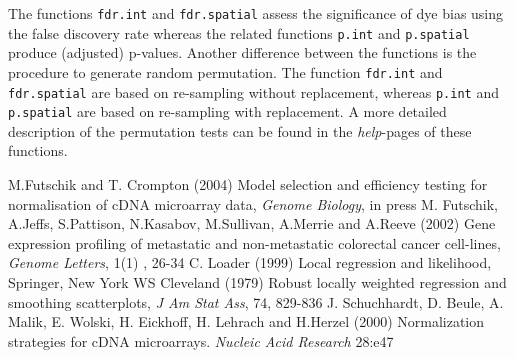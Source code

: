 \documentclass[a4paper,11pt]{article}
\begin{document}
The functions \texttt{fdr.int} and \texttt{fdr.spatial} assess the significance of dye bias using the false discovery
rate whereas the related  functions \texttt{p.int} and \texttt{p.spatial} produce (adjusted) p-values.
Another difference between the functions is the procedure to generate random permutation.
The function \texttt{fdr.int} and \texttt{fdr.spatial} are based on re-sampling without replacement,
whereas  \texttt{p.int} and \texttt{p.spatial} are based on re-sampling with replacement.  
A more detailed description of the permutation tests can be found in the \textit{help}-pages of these functions.



\begin{thebibliography}{99}
 M.Futschik and T. Crompton (2004) Model selection and efficiency testing for normalisation of cDNA microarray data, \emph{Genome Biology}, in press
 M. Futschik, A.Jeffs, S.Pattison, N.Kasabov, M.Sullivan, A.Merrie and A.Reeve (2002) Gene expression profiling of metastatic and non-metastatic colorectal cancer cell-lines,  \emph{Genome Letters}, 1(1) , 26-34
 C. Loader (1999) Local regression and likelihood, Springer, New York
 WS Cleveland (1979) Robust locally weighted regression and smoothing scatterplots,
\emph{J Am Stat Ass}, 74, 829-836
 J. Schuchhardt, D. Beule, A. Malik, E. Wolski, H. Eickhoff, H. Lehrach and H.Herzel (2000)
Normalization strategies for cDNA microarrays. \emph{Nucleic Acid Research} 28:e47



\end{thebibliography}
\end{document}
